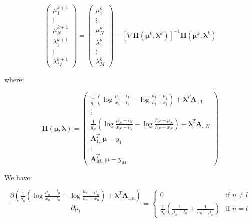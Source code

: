 \documentclass{tex/note}
\begin{document}
\begin{equation*}
\begin{pmatrix} \mu_1^{k + 1} \\ \vdots \\ \mu_N^{k + 1} \\ \lambda_1^{k + 1} \\ \vdots \\ \lambda_M^{k + 1} \end{pmatrix} = \begin{pmatrix} \mu_1^k \\ \vdots \\ \mu_N^k \\ \lambda_1^k \\ \vdots \\ \lambda_M^k \end{pmatrix} - \left[ \nabla \bm{H} \left( \bm{\mu}^k , \bm{\lambda}^k \right) \right] ^{-1} \bm{H} \left( \bm{\mu}^k , \bm{\lambda}^k \right)
\end{equation*}

where:

\begin{equation*}
\bm{H} \left( \bm{\mu} , \bm{\lambda} \right) = \begin{pmatrix} \frac{1}{q_1} \left( \log \frac{\mu_1 - l_1}{x_1 - l_1} - \log \frac{h_1 - \mu_1}{h_1 - x_1} \right) + \bm{\lambda}^T \bm{A}_{.,1} \\ \vdots \\ \frac{1}{q_N} \left( \log \frac{\mu_N - l_N}{x_N - l_N} - \log \frac{h_N - \mu_N}{h_N - x_N} \right) + \bm{\lambda}^T \bm{A}_{.,N} \\ \bm{A}_{1,.}^T \bm{\mu} - y_1 \\ \vdots \\ \bm{A}_{M,.}^T \bm{\mu} - y_M \end{pmatrix}
\end{equation*}

We have:

\begin{equation*}
\frac{\partial \left( \frac{1}{q_n} \left( \log \frac{\mu_n - l_n}{x_n - l_n} - \log \frac{h_n - \mu_n}{h_n - x_n} \right) + \bm{\lambda}^T \bm{A}_{.,n} \right)}{\partial \mu_l} =
\begin{cases}
0 & \text{if } n \neq l \\
\frac{1}{q_n} \left( \frac{1}{\mu_n - l_n} + \frac{1}{h_n - \mu_n} \right) & \text{if } n = l
\end{cases}
\end{equation*}
\end{document}
